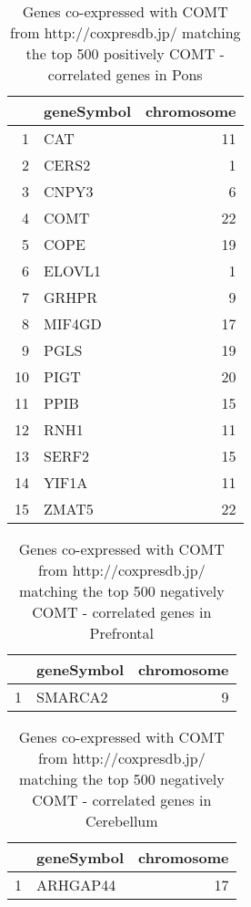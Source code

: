 \documentclass[letterpaper,12pt]{article}
\numberwithin{equation}{appendix}
\begin{document}
{{\clearpage
\begin{table}[ht]
\centering
\begin{tabular}{rlr}
  \hline
 & geneSymbol & chromosome \\ 
  \hline
1 & CAT &  11 \\ 
  2 & CERS2 &   1 \\ 
  3 & CNPY3 &   6 \\ 
  4 & COMT &  22 \\ 
  5 & COPE &  19 \\ 
  6 & ELOVL1 &   1 \\ 
  7 & GRHPR &   9 \\ 
  8 & MIF4GD &  17 \\ 
  9 & PGLS &  19 \\ 
  10 & PIGT &  20 \\ 
  11 & PPIB &  15 \\ 
  12 & RNH1 &  11 \\ 
  13 & SERF2 &  15 \\ 
  14 & YIF1A &  11 \\ 
  15 & ZMAT5 &  22 \\ 
   \hline
\end{tabular}
\caption{Genes co-expressed with COMT from http://coxpresdb.jp/ matching the top 500 positively COMT - correlated genes in Pons} 
\end{table}

\clearpage
\begin{table}[ht]
\centering
\begin{tabular}{rlr}
  \hline
 & geneSymbol & chromosome \\ 
  \hline
1 & SMARCA2 &   9 \\ 
   \hline
\end{tabular}
\caption{Genes co-expressed with COMT from http://coxpresdb.jp/ matching the top 500 negatively COMT - correlated genes in Prefrontal} 
\end{table}

\clearpage
\begin{table}[ht]
\centering
\begin{tabular}{rlr}
  \hline
 & geneSymbol & chromosome \\ 
  \hline
1 & ARHGAP44 &  17 \\ 
   \hline
\end{tabular}
\caption{Genes co-expressed with COMT from http://coxpresdb.jp/ matching the top 500 negatively COMT - correlated genes in Cerebellum} 
\end{table}

}}
\end{document}
